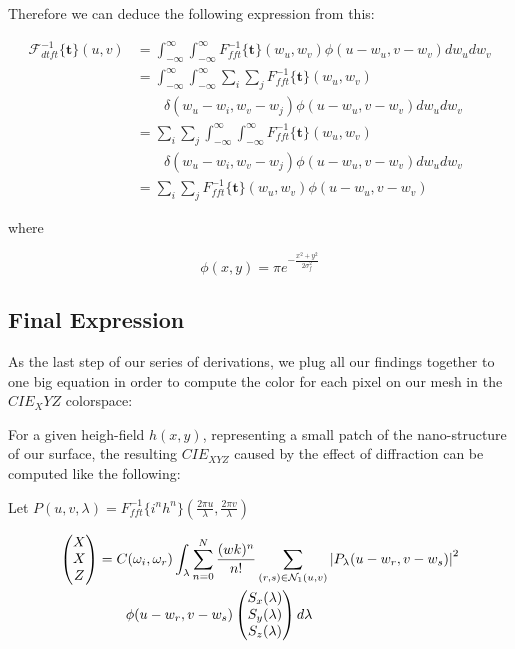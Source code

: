 Therefore we can deduce the following expression from this:

\begin{align*}
\mathcal{F}_{dtft}^{-1}\{\mathbf{t}\}(u,v)
& = \int_{-\infty}^{\infty} \int_{-\infty}^{\infty} {F}_{fft}^{-1}\{\mathbf{t}\}(w_u,w_v) \phi(u-w_u, v-w_v) dw_u dw_v \\
& = \int_{-\infty}^{\infty} \int_{-\infty}^{\infty} \sum_i \sum_j {F}_{fft}^{-1}\{\mathbf{t}\}(w_u,w_v) \\ 
& \quad \quad \delta(w_u-w_i, w_v-w_j)\phi(u-w_u, v-w_v) dw_u dw_v \\
& = \sum_i \sum_j \int_{-\infty}^{\infty} \int_{-\infty}^{\infty}  {F}_{fft}^{-1}\{\mathbf{t}\}(w_u,w_v) \\
& \quad \quad \delta(w_u-w_i, w_v-w_j)\phi(u-w_u, v-w_v) dw_u dw_v \\
& = \sum_i \sum_j {F}_{fft}^{-1}\{\mathbf{t}\}(w_u,w_v) \phi(u-w_u, v-w_v)
\end{align*}

where 

\begin{equation} \label{eq:gaussweight}
 \phi(x,y) = \pi e^{-\frac{x^2 + y^2}{2\sigma_{f}^2}}
\end{equation} 

\subsection{Final Expression}
As the last step of our series of derivations, we plug all our findings together to one big equation in order to compute the color for each pixel on our mesh in the $CIE_XYZ$ colorspace:

For a given heigh-field $h(x,y)$, representing a small patch of the nano-structure of our surface, the resulting $CIE_{XYZ}$ caused by the effect of diffraction can be computed like the following: 

Let $P(u,v,\lambda) = {F}_{fft}^{-1}\{i^n h^n\}(\frac{2\pi u}{\lambda},\frac{2\pi v}{\lambda})$

\begin{equation}
\begin{split}
\colvec[X]{X}{Z}& = C(\omega_i,\omega_r) \int_{\lambda} \sum_{n=0}^N  \frac{(wk)^n}{n!} \sum_{(r,s) \in \mathcal{N}_1(u,v)} \left| P_{\lambda}(u-w_r,v-w_s) \right|^2 \\
& \quad \quad  \phi(u-w_r, v-w_s) \colvec[S_x(\lambda)]{S_y(\lambda)}{S_z(\lambda)}d\lambda
\end{split}
\end{equation}

